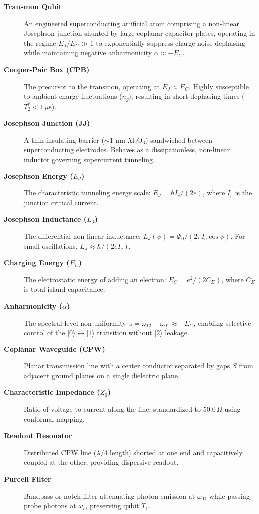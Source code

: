 \documentclass[10pt,journal,compsoc]{IEEEtran}
\begin{document}
\begin{description}
    \item[\textbf{Transmon Qubit}] An engineered superconducting artificial atom comprising a non-linear Josephson junction shunted by large coplanar capacitor plates, operating in the regime $E_J / E_C \gg 1$ to exponentially suppress charge-noise dephasing while maintaining negative anharmonicity $\alpha \approx -E_C$.
    \item[\textbf{Cooper-Pair Box (CPB)}] The precursor to the transmon, operating at $E_J \approx E_C$. Highly susceptible to ambient charge fluctuations ($n_g$), resulting in short dephasing times ($T_2^* < 1\,\mu\text{s}$).
    \item[\textbf{Josephson Junction (JJ)}] A thin insulating barrier ($\sim 1\text{ nm}$ $\text{Al}_2\text{O}_3$) sandwiched between superconducting electrodes. Behaves as a dissipationless, non-linear inductor governing supercurrent tunneling.
    \item[\textbf{Josephson Energy ($E_J$)}] The characteristic tunneling energy scale: $E_J = \hbar I_c / (2e)$, where $I_c$ is the junction critical current.
    \item[\textbf{Josephson Inductance ($L_J$)}] The differential non-linear inductance: $L_J(\phi) = \Phi_0 / (2\pi I_c \cos\phi)$. For small oscillations, $L_J \approx \hbar / (2e I_c)$.
    \item[\textbf{Charging Energy ($E_C$)}] The electrostatic energy of adding an electron: $E_C = e^2 / (2C_\Sigma)$, where $C_\Sigma$ is total island capacitance.
    \item[\textbf{Anharmonicity ($\alpha$)}] The spectral level non-uniformity $\alpha = \omega_{12} - \omega_{01} \approx -E_C$, enabling selective control of the $|0\rangle \leftrightarrow |1\rangle$ transition without $|2\rangle$ leakage.
    \item[\textbf{Coplanar Waveguide (CPW)}] Planar transmission line with a center conductor separated by gaps $S$ from adjacent ground planes on a single dielectric plane.
    \item[\textbf{Characteristic Impedance ($Z_0$)}] Ratio of voltage to current along the line, standardized to $50.0\,\Omega$ using conformal mapping.
    \item[\textbf{Readout Resonator}] Distributed CPW line ($\lambda/4$ length) shorted at one end and capacitively coupled at the other, providing dispersive readout.
    \item[\textbf{Purcell Filter}] Bandpass or notch filter attenuating photon emission at $\omega_{01}$ while passing probe photons at $\omega_r$, preserving qubit $T_1$.

\end{description}
\end{document}
